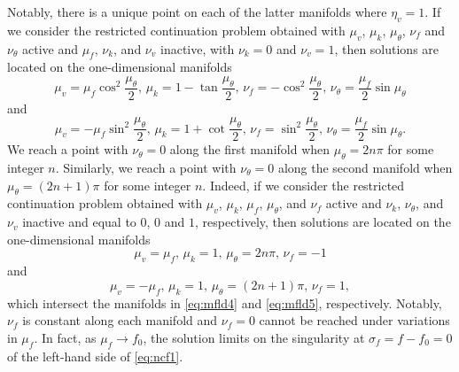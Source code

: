 Notably, there is a unique point on each of the latter manifolds where $\eta_v=1$. If we consider the restricted continuation problem obtained with $\mu_v$, $\mu_k$, $\mu_\theta$, $\nu_f$ and $\nu_\theta$ active and $\mu_f$, $\nu_k$, and $\nu_v$ inactive, with $\nu_k=0$ and $\nu_v=1$, then solutions are located on the one-dimensional manifolds
\begin{equation}
\label{eq:mfld4}
\mu_v=\mu_f\cos^2\frac{\mu_\theta}{2},\,\mu_k=1-\tan\frac{\mu_\theta}{2},\,\nu_f=-\cos^2\frac{\mu_\theta}{2},\,\nu_\theta=\frac{\mu_f}{2}\sin\mu_\theta
\end{equation}
and
\begin{equation}
\label{eq:mfld5}
\mu_v=-\mu_f\sin^2\frac{\mu_\theta}{2},\,\mu_k=1+\cot\frac{\mu_\theta}{2},\,\nu_f=\sin^2\frac{\mu_\theta}{2},\,\nu_\theta=\frac{\mu_f}{2}\sin\mu_\theta.
\end{equation}
We reach a point with $\nu_\theta=0$ along the first manifold when $\mu_\theta=2n\pi$ for some integer $n$. Similarly, we reach a point with $\nu_\theta=0$ along the second manifold when $\mu_\theta=(2n+1)\pi$ for some integer $n$. Indeed, if we consider the restricted continuation problem obtained with $\mu_v$, $\mu_k$, $\mu_f$, $\mu_\theta$, and $\nu_f$ active and $\nu_k$, $\nu_\theta$, and $\nu_v$ inactive and equal to $0$, $0$ and $1$, respectively, then solutions are located on the one-dimensional manifolds
\begin{equation}
\mu_v=\mu_f,\,\mu_k=1,\,\mu_\theta=2n\pi,\,\nu_f=-1
\end{equation}
and
\begin{equation}
\mu_v=-\mu_f,\,\mu_k=1,\,\mu_\theta=(2n+1)\pi,\,\nu_f=1,
\end{equation}
which intersect the manifolds in \eqref{eq:mfld4} and \eqref{eq:mfld5}, respectively. Notably, $\nu_f$ is constant along each manifold and $\nu_f=0$ cannot be reached under variations in $\mu_f$. In fact, as $\mu_f\to f_0$, the solution limits on the singularity at $\sigma_f=f-f_0=0$ of the left-hand side of \eqref{eq:ncf1}.


